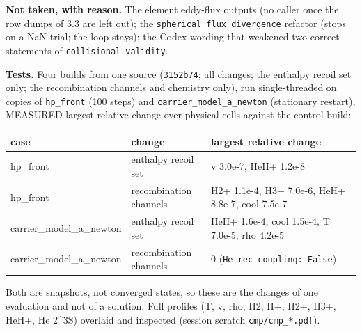\documentclass[english,a4paper]{my_memo}
\begin{document}
\textbf{Not taken, with reason.} The element eddy-flux outputs (no caller once
the row dumps of 3.3 are left out); the \texttt{spherical\_flux\_divergence}
refactor (stops on a NaN trial; the loop stays); the Codex wording that
weakened two correct statements of \texttt{collisional\_validity}.

\textbf{Tests.} Four builds from one source (\texttt{3152b74}; all changes; the
enthalpy recoil set only; the recombination channels and chemistry only),
run single-threaded on copies of \texttt{hp\_front} (100 steps) and
\texttt{carrier\_model\_a\_newton} (stationary restart), MEASURED largest relative
change over physical cells against the control build:

{\def\LTcaptype{none} %
{\small
\begin{longtable}[]{@{}lll@{}}
\toprule\noalign{}
case & change & largest relative change \\
\midrule\noalign{}
\endhead
\bottomrule\noalign{}
\endlastfoot
hp\_front & enthalpy recoil set & v 3.0e-7, HeH+ 1.2e-8 \\
hp\_front & recombination channels & H2+ 1.1e-4, H3+ 7.0e-6, HeH+ 8.8e-7, cool 7.5e-7 \\
carrier\_model\_a\_newton & enthalpy recoil set & HeH+ 1.6e-4, cool 1.5e-4, T 7.0e-5, rho 4.2e-5 \\
carrier\_model\_a\_newton & recombination channels & 0 (\texttt{He\_rec\_coupling:\ False}) \\
\end{longtable}
}
}

Both are snapshots, not converged states, so these are the changes of one
evaluation and not of a solution. Full profiles (T, v, rho, H2, H+, H2+,
H3+, HeH+, He 2\^{}3S) overlaid and inspected (session scratch
\texttt{cmp/cmp\_*.pdf}).
\end{document}

